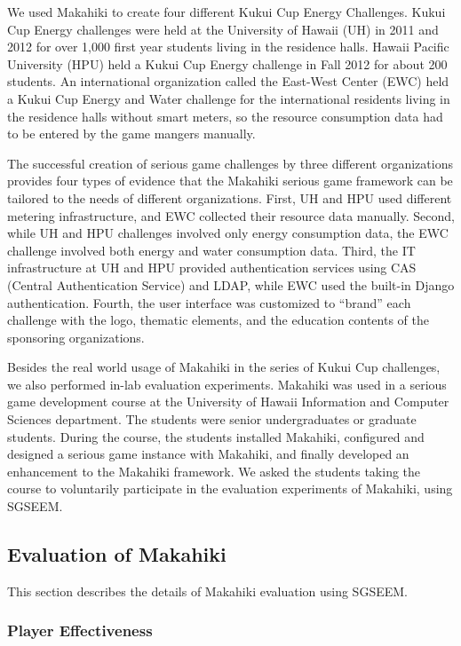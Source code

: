 \documentclass{sigchi}
\begin{document}
We used Makahiki to create four different Kukui
Cup Energy Challenges. Kukui Cup Energy challenges were held at the
University of Hawaii (UH) in 2011 and 2012 for over 1,000 first
year students living in the residence halls. Hawaii Pacific University
(HPU) held a Kukui Cup Energy challenge in Fall 2012 for about 200
students. An international organization called the East-West Center
(EWC) held a Kukui Cup Energy and Water challenge for the
international residents living in the residence halls without smart
meters, so the resource consumption data had to be entered by the game
mangers manually.

The successful creation of serious game challenges by three different organizations
provides four types of evidence that the Makahiki serious game framework can be tailored
to the needs of different organizations. First, UH and HPU used different metering
infrastructure, and EWC collected their resource data manually.  Second, while UH and HPU
challenges involved only energy consumption data, the EWC challenge involved both energy
and water consumption data. Third, the IT infrastructure at UH and HPU provided
authentication services using CAS (Central Authentication Service) and LDAP, while EWC
used the built-in Django authentication.  Fourth, the user interface was customized to
``brand'' each challenge with the logo, thematic elements, and the education contents of
the sponsoring organizations.

Besides the real world usage of Makahiki in the series of Kukui Cup challenges, we also
performed in-lab evaluation experiments. Makahiki was used in a serious game development
course at the University of Hawaii Information and Computer Sciences department. The
students were senior undergraduates or graduate students. During the course, the students
installed Makahiki, configured and designed a serious game instance with Makahiki, and
finally developed an enhancement to the Makahiki framework. We asked the students taking
the course to voluntarily participate in the evaluation experiments of Makahiki, using
SGSEEM.

\subsection{Evaluation of Makahiki}

This section describes the details of Makahiki evaluation using SGSEEM.

\subsubsection{Player Effectiveness}
\end{document}
